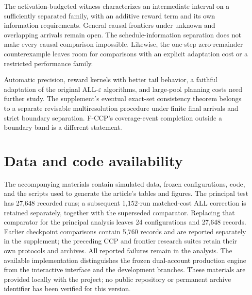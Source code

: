 \documentclass[11pt]{article}
\theoremstyle{remark}
\begin{document}
The activation-budgeted witness characterizes an intermediate interval
on a sufficiently separated family, with an additive reward term and
its own information requirements. General causal frontiers under
unknown and overlapping arrivals remain open. The schedule-information
separation does not make every causal comparison impossible. Likewise,
the one-step zero-remainder counterexample leaves room for comparisons
with an explicit adaptation cost or a restricted performance family.

Automatic precision, reward kernels with better tail behavior, a faithful
adaptation of the original ALL-$\varepsilon$ algorithms, and large-pool
planning costs need further study. The supplement's eventual exact-set
consistency theorem belongs to a separate revisable multiresolution
procedure under finite final arrivals and strict boundary separation.
F-CCP's coverage-event completion outside a boundary band is a different
statement.

\section*{Data and code availability}
\enlargethispage{\baselineskip}
The accompanying materials contain simulated data, frozen configurations,
code, and the scripts used to generate the article's tables and figures.
The principal test has 27,648 recorded runs; a subsequent 1,152-run
matched-cost ALL correction is retained separately, together with the
superseded comparator. Replacing that comparator for the principal
analysis leaves 24 configurations and 27,648 records. Earlier checkpoint
comparisons contain 5,760 records and are reported separately in the
supplement; the preceding CCP and frontier research suites retain their
own protocols and archives. All reported failures remain in the analysis.
The available implementation distinguishes the frozen dual-account
production engine from the interactive interface and the development
branches. These materials are provided locally with the project; no
public repository or permanent archive identifier has been verified for
this version.
\end{document}
